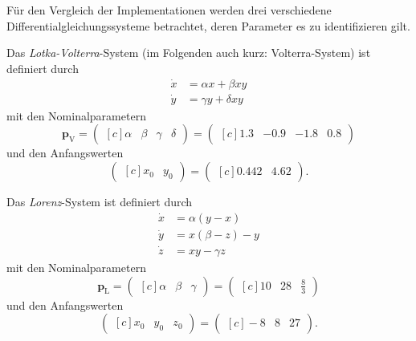 Für den Vergleich der Implementationen werden drei verschiedene Differentialgleichungssysteme betrachtet, deren Parameter es zu identifizieren gilt.

Das \textit{Lotka-Volterra}-System (im Folgenden auch kurz: Volterra-System) ist definiert durch
\begin{equation}
\begin{aligned}
\dot{x} &= \alpha x +\beta xy\\
\dot{y} &= \gamma y + \delta xy \label{eq:volterra}
\end{aligned}
\end{equation}
mit den Nominalparametern
\begin{equation}
\boldsymbol{p}_\text{V}=	\begin{pmatrix*}[c]
				\alpha&\beta&\gamma&\delta
				\end{pmatrix*} = 
				\begin{pmatrix*}[c]
					1.3& -0.9&  -1.8 & 0.8
				\end{pmatrix*}
\end{equation}
und den Anfangswerten
\begin{equation}
\begin{pmatrix*}[c]
				x_0 & y_0
				\end{pmatrix*} = 
				\begin{pmatrix*}[c]
					0.442 & 4.62
				\end{pmatrix*}.
\end{equation}

Das \textit{Lorenz}-System ist definiert durch
\begin{equation}
\begin{aligned}
\dot{x} &= \alpha(y-x)\\
\dot{y} &= x(\beta - z) -y\\
\dot{z} &= xy-\gamma z
\end{aligned}
\end{equation}
mit den Nominalparametern
\begin{equation}
\boldsymbol{p}_\text{L}=	\begin{pmatrix*}[c]
				\alpha&\beta&\gamma
				\end{pmatrix*} = 
				\begin{pmatrix*}[c]
					10& 28& \frac{8}{3}
				\end{pmatrix*}
\end{equation}
und den Anfangswerten
\begin{equation}
\begin{pmatrix*}[c]
				x_0 & y_0 & z_0
				\end{pmatrix*} = 
				\begin{pmatrix*}[c]
				-8& 8& 27
				\end{pmatrix*}.
\end{equation}

